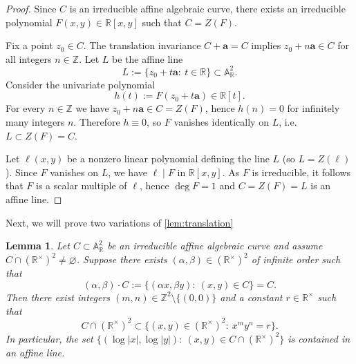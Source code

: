 \documentclass[12pt,reqno]{amsart}
\numberwithin{equation}{section}
\newtheorem{lemma}[theorem]{Lemma}
\begin{document}
\begin{proof}
Since $C$ is an irreducible affine algebraic curve, there exists an irreducible polynomial
$F(x,y)\in \mathbb{R}[x,y]$ such that $C=Z(F)$.

Fix a point $z_0\in C$. The translation invariance $C+\mathbf a=C$ implies
$z_0+n\mathbf a\in C$ for all integers $n\in\mathbb{Z}$.
Let $L$ be the affine line
\[
L:=\{z_0+t\mathbf a:\ t\in \mathbb{R}\}\subset \mathbb{A}^2_{\mathbb{R}}.
\]
Consider the univariate polynomial
\[
h(t):=F(z_0+t\mathbf a)\in \mathbb{R}[t].
\]
For every $n\in\mathbb{Z}$ we have $z_0+n\mathbf a\in C=Z(F)$, hence $h(n)=0$ for infinitely many integers $n$.
Therefore $h\equiv 0$, so $F$ vanishes identically on $L$, i.e.\ $L\subset Z(F)=C$.

Let $\ell(x,y)$ be a nonzero linear polynomial defining the line $L$ (so $L=Z(\ell)$).
Since $F$ vanishes on $L$, we have $\ell\mid F$ in $\mathbb{R}[x,y]$. As $F$ is irreducible, it follows that
$F$ is a scalar multiple of $\ell$, hence $\deg F=1$ and $C=Z(F)=L$ is an affine line.
\end{proof}
Next, we will prove two variations of \ref{lem:translation}
\begin{lemma}\label{lem:mult_translation}
Let $C\subset \mathbb{A}^2_{\mathbb{R}}$ be an irreducible affine algebraic curve and assume
$C\cap (\mathbb{R}^{\times})^2\neq\varnothing$.
Suppose there exists $(\alpha,\beta)\in(\mathbb{R}^{\times})^2$ of infinite order such that
\[
(\alpha,\beta)\cdot C := \{(\alpha x,\beta y):\ (x,y)\in C\}=C .
\]
Then there exist integers $(m,n)\in\mathbb{Z}^2\setminus\{(0,0)\}$ and a constant $r\in\mathbb{R}^{\times}$ such that
\[
C\cap (\mathbb{R}^{\times})^2 \subset \{(x,y)\in(\mathbb{R}^{\times})^2:\ x^m y^n=r\}.
\]
In particular, the set $\{(\log|x|,\log|y|):\ (x,y)\in C\cap(\mathbb{R}^{\times})^2\}$ is contained in an affine line.
\end{lemma}
\end{document}

